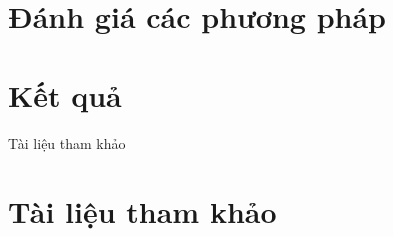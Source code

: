 \documentclass{beamer}
\begin{document}
\section{Đánh giá các phương pháp}
\section{Kết quả}
\begin{frame}{Tài liệu tham khảo}
\section*{Tài liệu tham khảo}
\end{frame}
\end{document}
